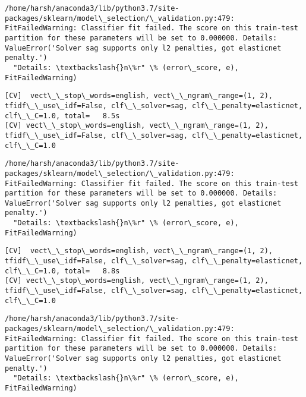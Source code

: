 \documentclass[11pt]{article}
\begin{document}
    \begin{Verbatim}[commandchars=\\\{\}]
/home/harsh/anaconda3/lib/python3.7/site-packages/sklearn/model\_selection/\_validation.py:479: FitFailedWarning: Classifier fit failed. The score on this train-test partition for these parameters will be set to 0.000000. Details: 
ValueError('Solver sag supports only l2 penalties, got elasticnet penalty.')
  "Details: \textbackslash{}n\%r" \% (error\_score, e), FitFailedWarning)

    \end{Verbatim}

    \begin{Verbatim}[commandchars=\\\{\}]
[CV]  vect\_\_stop\_words=english, vect\_\_ngram\_range=(1, 2), tfidf\_\_use\_idf=False, clf\_\_solver=sag, clf\_\_penalty=elasticnet, clf\_\_C=1.0, total=   8.5s
[CV] vect\_\_stop\_words=english, vect\_\_ngram\_range=(1, 2), tfidf\_\_use\_idf=False, clf\_\_solver=sag, clf\_\_penalty=elasticnet, clf\_\_C=1.0 

    \end{Verbatim}

    \begin{Verbatim}[commandchars=\\\{\}]
/home/harsh/anaconda3/lib/python3.7/site-packages/sklearn/model\_selection/\_validation.py:479: FitFailedWarning: Classifier fit failed. The score on this train-test partition for these parameters will be set to 0.000000. Details: 
ValueError('Solver sag supports only l2 penalties, got elasticnet penalty.')
  "Details: \textbackslash{}n\%r" \% (error\_score, e), FitFailedWarning)

    \end{Verbatim}

    \begin{Verbatim}[commandchars=\\\{\}]
[CV]  vect\_\_stop\_words=english, vect\_\_ngram\_range=(1, 2), tfidf\_\_use\_idf=False, clf\_\_solver=sag, clf\_\_penalty=elasticnet, clf\_\_C=1.0, total=   8.8s
[CV] vect\_\_stop\_words=english, vect\_\_ngram\_range=(1, 2), tfidf\_\_use\_idf=False, clf\_\_solver=sag, clf\_\_penalty=elasticnet, clf\_\_C=1.0 

    \end{Verbatim}

    \begin{Verbatim}[commandchars=\\\{\}]
/home/harsh/anaconda3/lib/python3.7/site-packages/sklearn/model\_selection/\_validation.py:479: FitFailedWarning: Classifier fit failed. The score on this train-test partition for these parameters will be set to 0.000000. Details: 
ValueError('Solver sag supports only l2 penalties, got elasticnet penalty.')
  "Details: \textbackslash{}n\%r" \% (error\_score, e), FitFailedWarning)

    \end{Verbatim}
\end{document}
